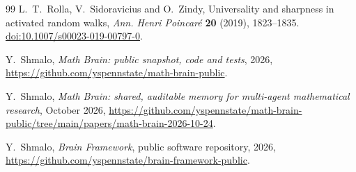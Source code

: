 \documentclass[11pt]{article}
\theoremstyle{remark}
\newcommand{\1}{\mathbf 1}
\begin{document}
\begin{thebibliography}{99}
L.~T.~Rolla, V.~Sidoravicius and O.~Zindy,
Universality and sharpness in activated random walks,
\emph{Ann. Henri Poincar\'e} \textbf{20} (2019), 1823--1835.
\href{https://doi.org/10.1007/s00023-019-00797-0}{doi:10.1007/s00023-019-00797-0}.

 Y.~Shmalo, \emph{Math Brain: public snapshot, code and tests}, 2026, \url{https://github.com/yspennstate/math-brain-public}.

 Y.~Shmalo, \emph{Math Brain: shared, auditable memory for multi-agent mathematical research}, October 2026, \url{https://github.com/yspennstate/math-brain-public/tree/main/papers/math-brain-2026-10-24}.

 Y.~Shmalo, \emph{Brain Framework}, public software repository, 2026, \url{https://github.com/yspennstate/brain-framework-public}.

\end{thebibliography}
\end{document}
